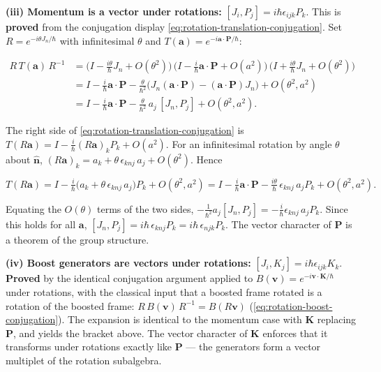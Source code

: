 \medskip\noindent\textbf{(iii) Momentum is a vector under rotations:} $[J_i,P_j]=i\hbar\epsilon_{ijk}P_k$. This is \textbf{proved} from the conjugation display \eqref{eq:rotation-translation-conjugation}. Set $R = e^{-i\theta J_n/\hbar}$ with infinitesimal $\theta$ and $T(\bm a) = e^{-i\bm a\cdot\bm P/\hbar}$:
\begin{linenomath}
\begin{align*}
R\,T(\bm a)\,R^{-1}
&= \bigl(I - \tfrac{i\theta}{\hbar}J_n + O(\theta^{2})\bigr)\,
   \bigl(I - \tfrac{i}{\hbar}\bm a\!\cdot\!\bm P + O(a^{2})\bigr)\,
   \bigl(I + \tfrac{i\theta}{\hbar}J_n + O(\theta^{2})\bigr) \\
&= I - \tfrac{i}{\hbar}\bm a\!\cdot\!\bm P
   - \tfrac{\theta}{\hbar^{2}}\bigl(J_n(\bm a\!\cdot\!\bm P) - (\bm a\!\cdot\!\bm P)J_n\bigr) + O(\theta^{2},a^{2}) \\
&= I - \tfrac{i}{\hbar}\bm a\!\cdot\!\bm P - \tfrac{\theta}{\hbar^{2}}\,a_j\,[J_n,P_j] + O(\theta^{2},a^{2}) .
\end{align*}
\end{linenomath}
The right side of \eqref{eq:rotation-translation-conjugation} is $T(R\bm a) = I - \frac{i}{\hbar}(R\bm a)_k P_k + O(a^{2})$. For an infinitesimal rotation by angle $\theta$ about $\hat{\bm n}$, $(R\bm a)_k = a_k + \theta\,\epsilon_{k n j}\,a_j + O(\theta^{2})$. Hence
\begin{linenomath}
\begin{equation*}
T(R\bm a) = I - \tfrac{i}{\hbar}\bigl(a_k + \theta\,\epsilon_{k n j}\,a_j\bigr)P_k + O(\theta^{2},a^{2})
= I - \tfrac{i}{\hbar}\bm a\!\cdot\!\bm P - \tfrac{i\theta}{\hbar}\,\epsilon_{k n j}\,a_j P_k + O(\theta^{2},a^{2}) .
\end{equation*}
\end{linenomath}
Equating the $O(\theta)$ terms of the two sides, $-\frac{1}{\hbar^{2}}a_j[J_n,P_j] = -\frac{i}{\hbar}\epsilon_{k n j}\,a_j P_k$. Since this holds for all $\bm a$, $[J_n,P_j] = i\hbar\,\epsilon_{k n j}P_k = i\hbar\,\epsilon_{n j k}P_k$. The vector character of $\bm P$ is a theorem of the group structure.

\medskip\noindent\textbf{(iv) Boost generators are vectors under rotations:} $[J_i,K_j]=i\hbar\epsilon_{ijk}K_k$. \textbf{Proved} by the identical conjugation argument applied to $B(\bm v) = e^{-i\bm v\cdot\bm K/\hbar}$ under rotations, with the classical input that a boosted frame rotated is a rotation of the boosted frame: $R\,B(\bm v)\,R^{-1} = B(R\bm v)$ (\eqref{eq:rotation-boost-conjugation}). The expansion is identical to the momentum case with $\bm K$ replacing $\bm P$, and yields the bracket above. The vector character of $\bm K$ enforces that it transforms under rotations exactly like $\bm P$ --- the generators form a vector multiplet of the rotation subalgebra.

